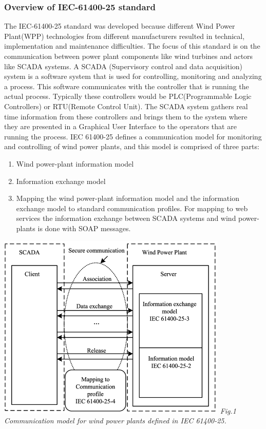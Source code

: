 \documentclass[twosided,a4,10pt]{article}
\begin{document}
\begin{multicols}{2}
  \subsubsection{Overview of IEC-61400-25 standard}
  	The IEC-61400-25 standard was developed because different Wind Power Plant(WPP) technologies from different manufacturers resulted in technical, implementation and maintenance difficulties. The focus of this standard is on the communication between power plant components like wind turbines and actors like SCADA systems. A SCADA (Supervisory control and data acquisition) system is a software system that is used for controlling, monitoring and analyzing a process. This software communicates with the controller that is running the actual process. Typically these controllers would be PLC(Programmable Logic Controllers) or RTU(Remote Control Unit). The SCADA system gathers real time information from these controllers and brings them to the system where they are presented in a Graphical User Interface to the operators that are running the process.\newline
  	IEC 61400-25 defines a communication model for monitoring and controlling of wind power plants, and this model is comprised of three parts:
  	\begin{enumerate}
  		\item Wind power-plant information model
  		\item Information exchange model
  		\item Mapping the wind power-plant information model and the information exchange model to standard communication profiles. For mapping to web services the information exchange between SCADA systems and wind power-plants is done with SOAP messages.
  	\end{enumerate}	
  	\includegraphics[scale=0.65]{IECProtocol.png}
  	\textit{Fig.1 Communication model for wind power plants defined in IEC 61400-25.} \newline

\end{multicols}
\end{document}
